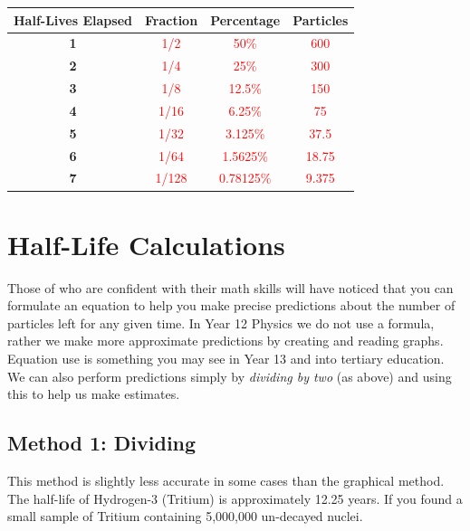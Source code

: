 \documentclass[12pt]{report}
\makeatletter
\DeclareRobustCommand{\fillinspace}[1]{%
	\ifthenelse
	{\boolean{@answer}}{\textcolor{red}{#1}}
	{\phantom{#1}}%
}
\makeatother
\begin{document}
\begin{table}[h]
	\centering
	\begin{tabular}{c|c|c|c|}
		\hline
		\multicolumn{1}{|c|}{\textbf{Half-Lives Elapsed}} & \textbf{Fraction}   & \textbf{Percentage}     & \textbf{Particles}  \\ \hline
		\multicolumn{1}{|c|}{\textbf{1}}                  & \fillinspace{1/2}   & \fillinspace{50\%}      & \fillinspace{600}   \\ \hline
		\multicolumn{1}{|c|}{\textbf{2}}                  & \fillinspace{1/4}   & \fillinspace{25\%}      & \fillinspace{300}   \\ \hline
		\multicolumn{1}{|c|}{\textbf{3}}                  & \fillinspace{1/8}   & \fillinspace{12.5\%}    & \fillinspace{150}   \\ \hline
		\multicolumn{1}{|c|}{\textbf{4}}                  & \fillinspace{1/16}  & \fillinspace{6.25\%}    & \fillinspace{75}    \\ \hline
		\multicolumn{1}{|c|}{\textbf{5}}                  & \fillinspace{1/32}  & \fillinspace{3.125\%}   & \fillinspace{37.5}  \\ \hline
		\multicolumn{1}{|c|}{\textbf{6}}                  & \fillinspace{1/64}  & \fillinspace{1.5625\%}  & \fillinspace{18.75} \\ \hline
		\multicolumn{1}{|c|}{\textbf{7}}                  & \fillinspace{1/128} & \fillinspace{0.78125\%} & \fillinspace{9.375} \\ \hline
	\end{tabular}
\end{table}

\section{Half-Life Calculations}
Those of who are confident with their math skills will have noticed that you can formulate an equation to help you make precise predictions about the number of particles left for any given time. In Year 12 Physics we do not use a formula, rather we make more approximate predictions by creating and reading graphs. Equation use is something you may see in Year 13 and into tertiary education.
We can also perform predictions simply by \textit{dividing by two} (as above) and using this to help us make estimates.

\subsection{Method 1: Dividing}
This method is slightly less accurate in some cases than the graphical method. The half-life of Hydrogen-3 (Tritium) is approximately 12.25 years. If you found a small sample of Tritium containing 5,000,000 un-decayed nuclei.
\end{document}
